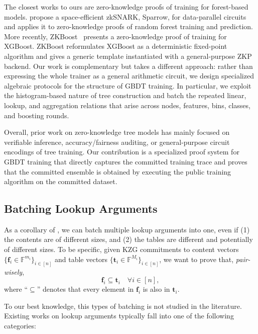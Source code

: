 The closest works to ours are zero-knowledge proofs of training for forest-based
models. \citet{sparrow24} propose a space-efficient zkSNARK, Sparrow, for
data-parallel circuits and applies it to 
zero-knowledge proofs of random forest training
and prediction.
More
recently, ZKBoost~\cite{zkboost26} presents a zero-knowledge proof of training for
XGBoost. ZKBoost reformulates XGBoost as a deterministic fixed-point algorithm
and gives a generic template instantiated with a general-purpose ZKP
backend. 
Our work is complementary but takes a different approach: rather than
expressing the whole trainer as a general arithmetic circuit, we design
specialized algebraic protocols for the structure of GBDT training. In
particular, we exploit the histogram-based nature of tree construction and batch
the repeated linear, lookup, and aggregation relations that arise across nodes,
features, bins, classes, and boosting rounds.

Overall, prior work on zero-knowledge tree models has mainly focused on
verifiable inference, accuracy/fairness auditing, or general-purpose circuit
encodings of tree training. Our contribution is a specialized proof system for
GBDT training that directly captures the committed training trace and proves
that the committed ensemble is obtained by executing the public
training algorithm on the committed dataset.

\subsection{Batching Lookup Arguments}
As a corollary of ,
    we can batch multiple lookup arguments into one,
    even if (1) the contents are of different sizes,
    and (2) the tables are different and potentially of different sizes.
    To be specific,
    given KZG commitments to content vectors $\{\mathbf{f}_i\in \mathbb{F}^{m_i}\}_{i\in [n]}$
    and table vectors $\{\mathbf{t}_i\in \mathbb{F}^{M_i}\}_{i\in [n]}$,
    we want to prove that, \emph{pair-wisely},
    \[
        \mathbf{f}_i \subseteq \mathbf{t}_i\quad \forall i\in [n],
    \]
    where ``$\subseteq$'' denotes that every element in $\mathbf{f}_i$ is also in $\mathbf{t}_i$.

To our best knowledge, this types of batching
    is not studied in the literature.
    Existing works on lookup arguments typically fall into one of the following categories:


